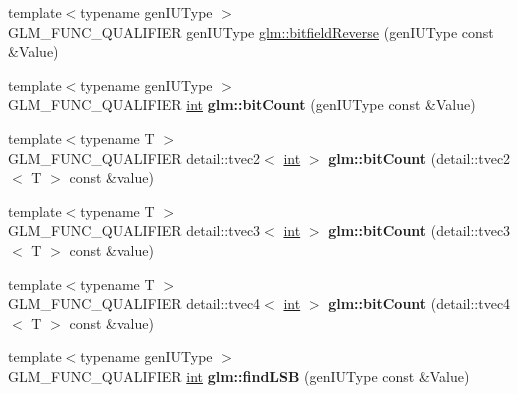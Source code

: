 \begin{DoxyCompactItemize}
\item 
{\footnotesize template$<$typename gen\+I\+U\+Type $>$ }\\G\+L\+M\+\_\+\+F\+U\+N\+C\+\_\+\+Q\+U\+A\+L\+I\+F\+I\+E\+R gen\+I\+U\+Type \hyperlink{group__core__func__integer_gac28880e609c6eeb0a28f1a54b1edc715}{glm\+::bitfield\+Reverse} (gen\+I\+U\+Type const \&Value)
\item 
\hypertarget{namespaceglm_a3327aadbf9816a3f8b182cbd9bcb1aac}{}{\footnotesize template$<$typename gen\+I\+U\+Type $>$ }\\G\+L\+M\+\_\+\+F\+U\+N\+C\+\_\+\+Q\+U\+A\+L\+I\+F\+I\+E\+R \hyperlink{_s_d_l__thread_8h_a6a64f9be4433e4de6e2f2f548cf3c08e}{int} {\bfseries glm\+::bit\+Count} (gen\+I\+U\+Type const \&Value)\label{namespaceglm_a3327aadbf9816a3f8b182cbd9bcb1aac}

\item 
\hypertarget{namespaceglm_ac28cce9c64a477f36cda400e50d0f6a2}{}{\footnotesize template$<$typename T $>$ }\\G\+L\+M\+\_\+\+F\+U\+N\+C\+\_\+\+Q\+U\+A\+L\+I\+F\+I\+E\+R detail\+::tvec2$<$ \hyperlink{_s_d_l__thread_8h_a6a64f9be4433e4de6e2f2f548cf3c08e}{int} $>$ {\bfseries glm\+::bit\+Count} (detail\+::tvec2$<$ T $>$ const \&value)\label{namespaceglm_ac28cce9c64a477f36cda400e50d0f6a2}

\item 
\hypertarget{namespaceglm_af60807263ebcc1859cbb5ffc034182f6}{}{\footnotesize template$<$typename T $>$ }\\G\+L\+M\+\_\+\+F\+U\+N\+C\+\_\+\+Q\+U\+A\+L\+I\+F\+I\+E\+R detail\+::tvec3$<$ \hyperlink{_s_d_l__thread_8h_a6a64f9be4433e4de6e2f2f548cf3c08e}{int} $>$ {\bfseries glm\+::bit\+Count} (detail\+::tvec3$<$ T $>$ const \&value)\label{namespaceglm_af60807263ebcc1859cbb5ffc034182f6}

\item 
\hypertarget{namespaceglm_a4559432c7a70a196a51a33891d6b6554}{}{\footnotesize template$<$typename T $>$ }\\G\+L\+M\+\_\+\+F\+U\+N\+C\+\_\+\+Q\+U\+A\+L\+I\+F\+I\+E\+R detail\+::tvec4$<$ \hyperlink{_s_d_l__thread_8h_a6a64f9be4433e4de6e2f2f548cf3c08e}{int} $>$ {\bfseries glm\+::bit\+Count} (detail\+::tvec4$<$ T $>$ const \&value)\label{namespaceglm_a4559432c7a70a196a51a33891d6b6554}

\item 
\hypertarget{namespaceglm_a984d0192bd95085d8efb0a1a00a4e6d9}{}{\footnotesize template$<$typename gen\+I\+U\+Type $>$ }\\G\+L\+M\+\_\+\+F\+U\+N\+C\+\_\+\+Q\+U\+A\+L\+I\+F\+I\+E\+R \hyperlink{_s_d_l__thread_8h_a6a64f9be4433e4de6e2f2f548cf3c08e}{int} {\bfseries glm\+::find\+L\+S\+B} (gen\+I\+U\+Type const \&Value)\label{namespaceglm_a984d0192bd95085d8efb0a1a00a4e6d9}


\end{DoxyCompactItemize}
